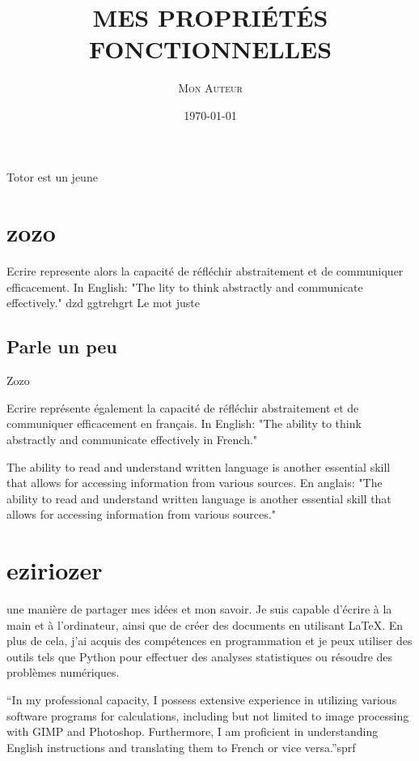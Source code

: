 \documentclass{article}
\title{\MakeUppercase{\textsc{Mes Propriétés Fonctionnelles}}}
\author{\textsc{Mon Auteur}}
\date{\today}
\begin{document}
\maketitle

Totor est un jeune

\section{zozo}

Ecrire represente alors la capacité de réfléchir abstraitement et de communiquer efficacement. In English: "The lity to think abstractly and communicate effectively." dzd ggtrehgrt
Le mot juste	

\subsection{Parle un peu}
Zozo

Ecrire représente également la capacité de réfléchir abstraitement et de communiquer efficacement en français. In English: "The ability to think abstractly and communicate effectively in French."

The ability to read and understand written language is another essential skill that allows for accessing information from various sources. En anglais: "The ability to read and understand written language is another essential skill that allows for accessing information from various sources."


\section{eziriozer}

une manière de partager mes idées et mon savoir. Je suis capable d'écrire à la main et à l'ordinateur, ainsi que de créer des documents en utilisant LaTeX. En plus de cela, j'ai acquis des compétences en programmation et je peux utiliser des outils tels que Python pour effectuer des analyses statistiques ou résoudre des problèmes numériques.



 ``In my professional capacity, I possess extensive experience in utilizing various software programs for calculations, including but not limited to image processing with GIMP and Photoshop. Furthermore, I am proficient in understanding English instructions and translating them to French or vice versa.''sprf
\end{document}

